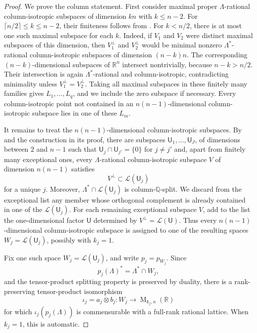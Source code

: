 \documentclass[reqno,11pt]{amsart}
\numberwithin{equation}{section}
\theoremstyle{definition}
\theoremstyle{remark}
\newcommand{\op}{\operatorname}
\newcommand{\M}{\op{M}}
\begin{document}
\begin{proof}
We prove the column statement. First consider maximal proper
$\Lambda$-rational column-isotropic subspaces of dimension $kn$ with
$k\le n-2$. For $\lceil n/2\rceil\le k\le n-2$, their finiteness follows
from . For $k<n/2$, there is at
most one such maximal subspace for each $k$. Indeed, if $V_1$ and $V_2$
were distinct maximal subspaces of this dimension, then $V_1^\perp$ and
$V_2^\perp$ would be minimal nonzero $\Lambda^*$-rational
column-isotropic subspaces of dimension $(n-k)n$.
The corresponding
$(n-k)$-dimensional subspaces of $\mathbb R^n$ intersect nontrivially,
because $n-k>n/2$. Their intersection is again $\Lambda^*$-rational and
column-isotropic, contradicting minimality unless $V_1^\perp=V_2^\perp$.
Taking all maximal subspaces in these finitely many families gives
$L_1,\ldots,L_q$, and we include the zero subspace if necessary. Every
column-isotropic point not contained in an $n(n-1)$-dimensional
column-isotropic subspace lies in one of these $L_m$.

It remains to treat the $n(n-1)$-dimensional column-isotropic subspaces. By
 and  the construction in its
proof, there are subspaces $\mathsf U_1,\ldots,\mathsf U_J$, of dimensions
between $2$ and $n-1$ such that $\mathsf U_j\cap\mathsf U_{j'}=\{0\}$ for $j\ne j'$ and, apart from finitely
many exceptional ones, every $\Lambda$-rational
column-isotropic subspace $V$ of dimension $n(n-1)$ satisfies
$$
V^\perp\subset \mathcal L(\mathsf U_j)
$$
for a unique $j$. Moreover, $\Lambda^*\cap\mathcal L(\mathsf U_j)$ is
column-$\mathbb Q$-split. We discard from the exceptional list any member
whose orthogonal complement is already contained in one of the
$\mathcal L(\mathsf U_j)$. For each remaining exceptional subspace $V$, add to the list the
one-dimensional factor $\mathsf U$ determined by $V^\perp=\mathcal L(\mathsf U)$. Thus every $n(n-1)$-dimensional column-isotropic subspace is assigned
to one of the resulting spaces $W_j=\mathcal L(\mathsf U_j)$, possibly with
$k_j=1$.

Fix one such space $W_j=\mathcal L(\mathsf U_j)$, and write $p_j=p_{W_j}$. Since
$$
p_j(\Lambda)^*=\Lambda^*\cap W_j,
$$
and the tensor-product splitting property is preserved by duality, there is a
rank-preserving tensor-product isomorphism
$$
\iota_j=a_j\otimes b_j:
W_j\to\M_{k_j,n}(\mathbb R)
$$
for which $\iota_j(p_j(\Lambda))$ is commensurable with a full-rank rational
lattice. When $k_j=1$, this is automatic.


\end{proof}
\end{document}

